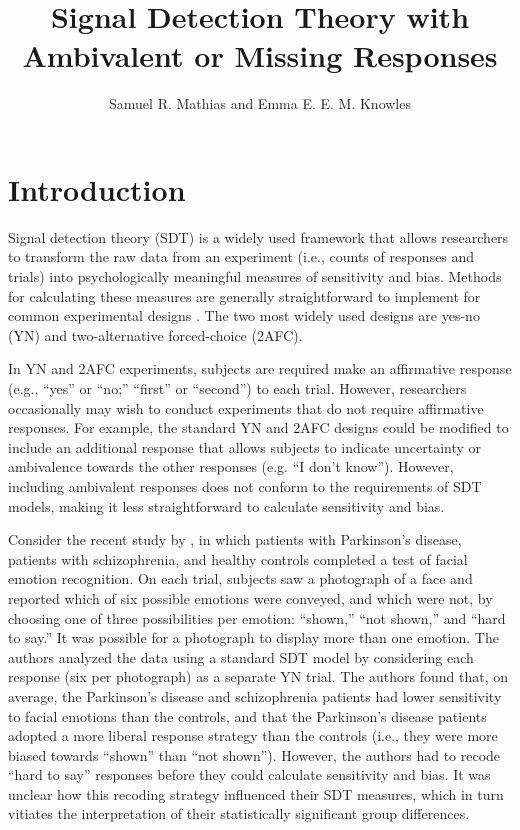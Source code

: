 \documentclass[man]{apa6}
\title{Signal Detection Theory with Ambivalent or Missing Responses}
\author{Samuel R. Mathias and Emma E. E. M. Knowles}
\affiliation{Yale University}
\begin{document}
\maketitle

\section{Introduction}
Signal detection theory (SDT) is a widely used framework that allows researchers to transform the raw data from an experiment (i.e., counts of responses and trials) into psychologically meaningful measures of sensitivity and bias. Methods for calculating these measures are generally straightforward to implement for common experimental designs \parencite[see][]{Green1966, Macmillan2005}. The two most widely used designs are yes-no (YN) and two-alternative forced-choice (2AFC).

In YN and 2AFC experiments, subjects are required make an affirmative response (e.g., ``yes'' or ``no;'' ``first'' or ``second'') to each trial. However, researchers occasionally may wish to conduct experiments that do not require affirmative responses. For example, the standard YN and 2AFC designs could be modified to include an additional response that allows subjects to indicate uncertainty or ambivalence towards the other responses (e.g. ``I don't know''). However, including ambivalent responses does not conform to the requirements of SDT models, making it less straightforward to calculate sensitivity and bias.

Consider the recent study by \textcite{laskowskaemotional2015}, in which patients with Parkinson's disease, patients with schizophrenia, and healthy controls completed a test of facial emotion recognition. On each trial, subjects saw a photograph of a face and reported which of six possible emotions were conveyed, and which were not, by choosing one of three possibilities per emotion: ``shown,'' ``not shown,'' and ``hard to say.'' It was possible for a photograph to display more than one emotion. The authors analyzed the data using a standard SDT model by considering each response (six per photograph) as a separate YN trial. The authors found that, on average, the Parkinson's disease and schizophrenia patients had lower sensitivity to facial emotions than the controls, and that the Parkinson's disease patients adopted a more liberal response strategy than the controls (i.e., they were more biased towards ``shown'' than ``not shown''). However, the authors had to recode ``hard to say'' responses before they could calculate sensitivity and bias. It was unclear how this recoding strategy influenced their SDT measures, which in turn vitiates the interpretation of their statistically significant group differences.
\end{document}
